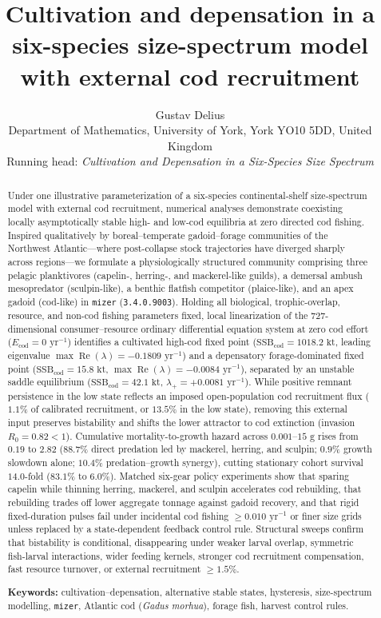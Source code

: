 \documentclass[11pt,letterpaper]{article}
\title{\textbf{Cultivation and depensation in a six-species size-spectrum model with external cod recruitment}}
\author{
  Gustav Delius\\[0.3em]
  \small Department of Mathematics, University of York, York YO10 5DD, United Kingdom\\[0.2em]
  \small Running head: \emph{Cultivation and Depensation in a Six-Species Size Spectrum}
}
\date{}
\begin{document}
\maketitle

\begin{abstract}
\noindent
Under one illustrative parameterization of a six-species continental-shelf size-spectrum model with external cod recruitment, numerical analyses demonstrate coexisting locally asymptotically stable high- and low-cod equilibria at zero directed cod fishing. Inspired qualitatively by boreal--temperate gadoid--forage communities of the Northwest Atlantic---where post-collapse stock trajectories have diverged sharply across regions---we formulate a physiologically structured community comprising three pelagic planktivores (capelin-, herring-, and mackerel-like guilds), a demersal ambush mesopredator (sculpin-like), a benthic flatfish competitor (plaice-like), and an apex gadoid (cod-like) in \texttt{mizer} (\texttt{3.4.0.9003}). Holding all biological, trophic-overlap, resource, and non-cod fishing parameters fixed, local linearization of the 727-dimensional consumer--resource ordinary differential equation system at zero cod effort ($E_{\mathrm{cod}} = 0\text{ yr}^{-1}$) identifies a cultivated high-cod fixed point ($\mathrm{SSB}_{\mathrm{cod}} = 1018.2\text{ kt}$, leading eigenvalue $\max\operatorname{Re}(\lambda) = -0.1809\text{ yr}^{-1}$) and a depensatory forage-dominated fixed point ($\mathrm{SSB}_{\mathrm{cod}} = 15.8\text{ kt}$, $\max\operatorname{Re}(\lambda) = -0.0084\text{ yr}^{-1}$), separated by an unstable saddle equilibrium ($\mathrm{SSB}_{\mathrm{cod}} = 42.1\text{ kt}$, $\lambda_+ = +0.0081\text{ yr}^{-1}$). While positive remnant persistence in the low state reflects an imposed open-population cod recruitment flux ($1.1\%$ of calibrated recruitment, or $13.5\%$ in the low state), removing this external input preserves bistability and shifts the lower attractor to cod extinction (invasion $R_0 = 0.82 < 1$). Cumulative mortality-to-growth hazard across $0.001$--$15\text{ g}$ rises from $0.19$ to $2.82$ ($88.7\%$ direct predation led by mackerel, herring, and sculpin; $0.9\%$ growth slowdown alone; $10.4\%$ predation--growth synergy), cutting stationary cohort survival $14.0$-fold ($83.1\%$ to $6.0\%$). Matched six-gear policy experiments show that sparing capelin while thinning herring, mackerel, and sculpin accelerates cod rebuilding, that rebuilding trades off lower aggregate tonnage against gadoid recovery, and that rigid fixed-duration pulses fail under incidental cod fishing $\ge 0.010\text{ yr}^{-1}$ or finer size grids unless replaced by a state-dependent feedback control rule. Structural sweeps confirm that bistability is conditional, disappearing under weaker larval overlap, symmetric fish-larval interactions, wider feeding kernels, stronger cod recruitment compensation, fast resource turnover, or external recruitment $\ge 1.5\%$.

\vspace{0.45em}
\noindent\textbf{Keywords:} cultivation--depensation, alternative stable states, hysteresis, size-spectrum modelling, \texttt{mizer}, Atlantic cod (\emph{Gadus morhua}), forage fish, harvest control rules.
\end{abstract}
\end{document}
